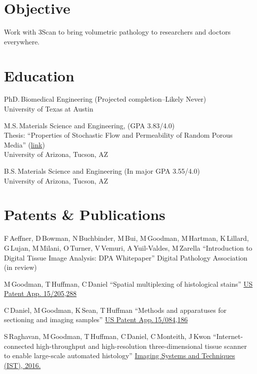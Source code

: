 \documentclass{res}
\begin{document}
\begin{resume}

\section{Objective}
Work with 3Scan to bring volumetric pathology to researchers and doctors everywhere.

\section{Education}
PhD.\,Biomedical Engineering (Projected completion--Likely Never) \\
University of Texas at Austin

M.S.\,Materials Science and Engineering,
(GPA 3.83/4.0) \\
Thesis: ``Properties of Stochastic Flow and Permeability of Random Porous Media''
  (\href{http://hdl.handle.net/10150/193422}{link})  \\
University of Arizona, Tucson, AZ

B.S.\,Materials Science and Engineering (In major GPA 3.55/4.0) \\
University of Arizona, Tucson, AZ

\section{Patents \& Publications}

  F\,Aeffner, D\,Bowman, N\,Buchbinder, M\,Bui, M\,Goodman, M\,Hartman, K\,Lillard,
  G\,Lujan, M\,Milani, O\,Turner, V\,Vemuri, A\,Yuil-Valdes, M\,Zarella
  ``Introduction to Digital Tissue Image Analysis: DPA Whitepaper''
  Digital Pathology Association (in review)

  M\,Goodman, T\,Huffman, C\,Daniel
  ``Spatial multiplexing of histological stains''
  \href{https://patents.google.com/patent/US20170011511A1/en}{US Patent App. 15/205,288}

  C\,Daniel, M\,Goodman, K\,Sean, T\,Huffman
  ``Methods and apparatuses for sectioning and imaging samples''
  \href{https://patents.google.com/patent/US20160290895A1/en}{US Patent App.\,15/084,186}

  S\,Raghavan, M\,Goodman, T\,Huffman, C\,Daniel, C\,Monteith, J\,Kwon
  ``Internet-connected high-throughput and high-resolution three-dimensional tissue scanner to
  enable large-scale automated histology''
  \href{https://doi.org/10.1109/IST.2016.7738254}{Imaging Systems and Techniques (IST), 2016.}


\end{resume}
\end{document}
